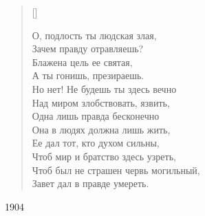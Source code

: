 \settowidth{\versewidth}{Чтоб был не страшен червь могильный}
\begin{verse}[\versewidth]
\begin{altverse}
О, подлость ты людская злая,\\
Зачем правду отравляешь?\\
Блажена цель ее святая,\\
А ты гонишь, презираешь.\\
Но нет! Не будешь ты здесь вечно\\
Над миром злобствовать, язвить,\\
Одна лишь правда бесконечно\\
Она в людях должна лишь жить,\\
Ее дал тот, кто духом сильны,\\
Чтоб мир и братство здесь узреть,\\
Чтоб был не страшен червь могильный,\\
Завет дал в правде умереть.
\end{altverse}
\end{verse}
1904


